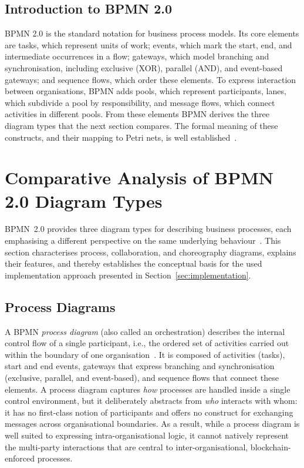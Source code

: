 \documentclass[runningheads]{llncs}
\begin{document}
\subsection{Introduction to BPMN 2.0}
BPMN 2.0 is the standard notation for business process models. Its core elements are tasks, which represent units of work; events, which mark the start, end, and intermediate occurrences in a flow; gateways, which model branching and synchronisation, including exclusive (XOR), parallel (AND), and event-based gateways; and sequence flows, which order these elements. To express interaction between organisations, BPMN adds pools, which represent participants, lanes, which subdivide a pool by responsibility, and message flows, which connect activities in different pools. From these elements BPMN derives the three diagram types that the next section compares. The formal meaning of these constructs, and their mapping to Petri nets, is well established~\cite{dijkman}.

\section{Comparative Analysis of BPMN 2.0 Diagram Types}

\label{sec:comparison}
BPMN~2.0 provides three diagram types for describing business processes, each emphasising a different perspective on the same underlying behaviour~\cite{bpmnexample}. This section characterises process, collaboration, and choreography diagrams, explains their features, and thereby establishes the conceptual basis for the used implementation approach presented in Section~\ref{sec:implementation}.


\subsection{Process Diagrams}
A BPMN \emph{process diagram} (also called an orchestration) describes the internal control flow of a single participant, i.e., the ordered set of activities carried out within the boundary of one organisation~\cite{dijkman}. It is composed of activities (tasks), start and end events, gateways that express branching and synchronisation (exclusive, parallel, and event-based), and sequence flows that connect these elements. A process diagram captures \emph{how} processes are handled inside a single control environment, but it deliberately abstracts from \emph{who} interacts with whom: it has no first-class notion of participants and offers no construct for exchanging messages across organisational boundaries. As a result, while a process diagram is well suited to expressing intra-organisational logic, it cannot natively represent the multi-party interactions that are central to inter-organisational, blockchain-enforced processes.
\end{document}
